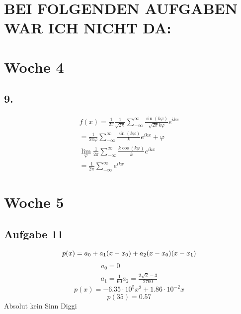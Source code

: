 \documentclass{article}
\begin{document}
\section*{BEI FOLGENDEN AUFGABEN WAR ICH NICHT DA:}

\section*{Woche 4}
    \subsection*{9.}
    \begin{eqnarray*}
        f\left(x\right)=\frac{1}{2\pi}\frac{1}{\sqrt{2\pi}}\sum_{-\infty}^{\infty} \frac{\sin(k\varphi)}{\sqrt{2\pi}k\varphi}e^{ikx}\\
            =\frac{1}{2\pi\varphi}\sum_{-\infty}^{\infty}\frac{\sin(k\varphi)}{k}e^{ikx}+\varphi\\
             \lim_{\varphi}\frac{1}{2\pi}\sum_{-\infty}^{\infty}\frac{k\cos(k\varphi)}{k}e^{ikx}\\
            =\frac{1}{2\pi}\sum_{-\infty}^{\infty}e^{ikx}
    \end{eqnarray*}

\section*{Woche 5}
\subsection*{Aufgabe 11}
\begin{equation*}
    p(x) = a_0+a_1(x-x_0)+a_2(x-x_0)(x-x_1)\\
\end{equation*}
\begin{eqnarray*}
    a_0 = 0\\
    a_1 = \frac{1}{60}
    a_2 = \frac{2\sqrt{2}-3}{2700}
\end{eqnarray*}
\begin{equation*}
    p(x) = -6.35\cdot10^{5}x^2+1.86\cdot 10^{-2}x
\end{equation*}
\begin{equation*}
    p(35) = 0.57
\end{equation*}
Absolut kein Sinn Diggi
\end{document}
